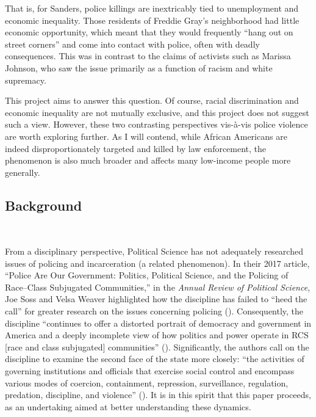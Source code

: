 \documentclass[12pt]{article}
\begin{document}
That is, for Sanders, police killings are inextricably tied to unemployment and economic inequality. Those residents of Freddie Gray's neighborhood had little economic opportunity, which meant that they would frequently “hang out on street corners” and come into contact with police, often with deadly consequences. This was in contrast to the claims of activists such as Marissa Johnson, who saw the issue primarily as a function of racism and white supremacy.

This project aims to answer this question. Of course, racial discrimination and economic inequality are not mutually exclusive, and this project does not suggest such a view. However, these two contrasting perspectives vis-à-vis police violence are worth exploring further. As I will contend, while African Americans are indeed disproportionately targeted and killed by law enforcement, the phenomenon is also much broader and affects many low-income people more generally. 

\subsection{Background}\

From a disciplinary perspective, Political Science has not adequately researched issues of policing and incarceration (a related phenomenon). In their 2017 article, “Police Are Our Government: Politics, Political Science, and the Policing of Race–Class Subjugated Communities,” in the \textit{Annual Review of Political Science}, Joe Soss and Velsa Weaver highlighted how the discipline has failed to “heed the call” for greater research on the issues concerning policing (\citeyear[568]{sossPoliceAreOur2017}). Consequently, the discipline “continues to offer a distorted portrait of democracy and government in America and a deeply incomplete view of how politics and power operate in RCS [race and class subjugated] communities” (\cite[568]{sossPoliceAreOur2017}). Significantly, the authors call on the discipline to examine the second face of the state more closely: ``the activities of governing institutions and officials that exercise social control and encompass various modes of coercion, containment, repression, surveillance, regulation, predation, discipline, and violence” (\cite[567]{sossPoliceAreOur2017}). It is in this spirit that this paper proceeds, as an undertaking aimed at better understanding these dynamics.
\end{document}
